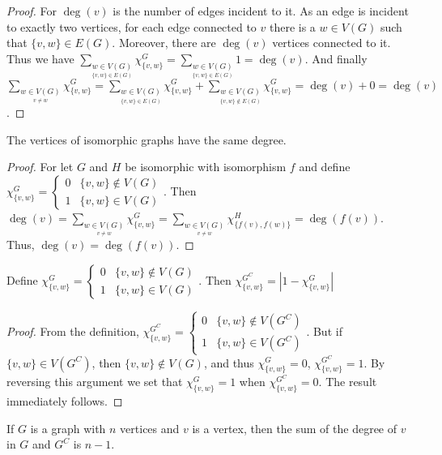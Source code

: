 \documentclass[crop=false,class=book,oneside]{standalone}
\begin{document}
\begin{proof}
For $\deg(v)$ is the number of edges incident to it. As an edge is incident to exactly two vertices, for each edge connected to $v$ there is a $w\in V(G)$ such that $\{v,w\} \in E(G)$. Moreover, there are $\deg(v)$ vertices connected to it. Thus we have $\sum_{\underset{\{v,w\}\in E(G)}{w\in V(G)}} \chi_{\{v,w\}}^G = \sum_{\underset{\{v,w\}\in E(G)}{w\in V(G)}}1 = \deg(v)$. And finally $\sum_{\underset{v\ne w}{w\in V(G)}}\chi_{\{v,w\}}^G = \sum_{\underset{\{v,w\}\in E(G)}{w\in V(G)}}\chi_{\{v,w\}}^G+\sum_{\underset{\{v,w\}\notin E(G)}{w\in V(G)}}\chi_{\{v,w\}}^G = \deg(v) + 0 = \deg(v)$.
\end{proof}
\begin{theorem}
The vertices of isomorphic graphs have the same degree.
\end{theorem}
\begin{proof}
For let $G$ and $H$ be isomorphic with isomorphism $f$ and define $\chi_{\{v,w\}}^G = \begin{cases} 0 & \{v,w\} \notin V(G) \\ 1 & \{v,w\} \in V(G) \end{cases}$. Then $\deg(v) = \sum_{\underset{v\ne w}{w\in V(G)}}\chi_{\{v,w\}}^G =\sum_{\underset{v\ne w}{w\in V(G)}}\chi_{\{f(v),f(w)\}}^H = \deg(f(v))$. Thus, $\deg(v) = \deg(f(v))$.
\end{proof}
\begin{lemma}
Define  $\chi_{\{v,w\}}^G = \begin{cases} 0 & \{v,w\} \notin V(G) \\ 1 & \{v,w\} \in V(G) \end{cases}$. Then $\chi_{\{v,w\}}^{G^C} = |1-\chi_{\{v,w\}}^G|$
\end{lemma}
\begin{proof}
From the definition, $\chi_{\{v,w\}}^{G^C} = \begin{cases} 0 & \{v,w\} \notin V(G^C) \\ 1 & \{v,w\} \in V(G^C) \end{cases}$. But if $\{v,w\} \in V({G^C})$, then $\{v,w\}\notin V(G)$, and thus $\chi_{\{v,w\}}^G = 0$, $\chi_{\{v,w\}}^{G^C} = 1$. By reversing this argument we set that $\chi_{\{v,w\}}^{G} = 1$ when $\chi_{\{v,w\}}^{G^C} = 0$. The result immediately follows.
\end{proof}
\begin{corollary}
If $G$ is a graph with $n$ vertices and $v$ is a vertex, then the sum of the degree of $v$ in $G$ and $G^C$ is $n-1$.
\end{corollary}
\end{document}
